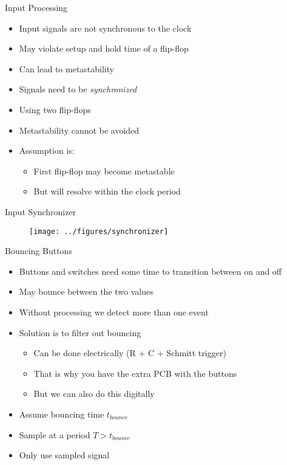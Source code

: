 \begin{frame}[fragile]{Input Processing}
\begin{itemize}
\item Input signals are not synchronous to the clock
\item May violate setup and hold time of a flip-flop
\item Can lead to metastability
\item Signals need to be \emph{synchronized}
\item Using two flip-flops
\item Metastability cannot be avoided
\item Assumption is:
\begin{itemize}
\item First flip-flop may become metastable
\item But will resolve within the clock period
\end{itemize}
\end{itemize}
\end{frame}

\begin{frame}[fragile]{Input Synchronizer}
\begin{figure}
  \texttt{[image: ../figures/synchronizer]}
\end{figure}
\end{frame}

\begin{frame}[fragile]{Bouncing Buttons}
\begin{itemize}
\item Buttons and switches need some time to transition between on and off
\item May bounce between the two values
\item Without processing we detect more than one event
\item Solution is to filter out bouncing
\begin{itemize}
\item Can be done electrically (R + C + Schmitt trigger)
\item That is why you have the extra PCB with the buttons
\item But we can also do this digitally
\end{itemize}
\item Assume  bouncing time $t_{bounce}$
\item Sample at a period $T > t_{bounce}$
\item Only use sampled signal
\end{itemize}
\end{frame}


